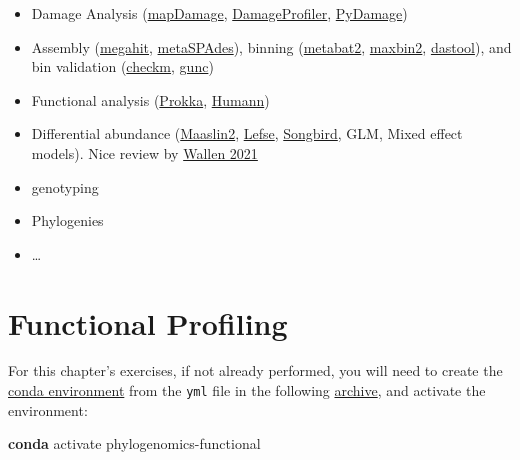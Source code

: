 \documentclass[
  letterpaper,
]{book}
\newenvironment{Shaded}{}{}
\newcommand{\ExtensionTok}[1]{\textcolor[rgb]{0.84,0.23,0.29}{\textbf{#1}}}
\newcommand{\NormalTok}[1]{\textcolor[rgb]{0.14,0.16,0.18}{#1}}
\providecommand{\tightlist}{%
  \setlength{\itemsep}{0pt}\setlength{\parskip}{0pt}}\usepackage{longtable,booktabs,array}
\begin{document}
\begin{itemize}
\tightlist
\item
  Damage Analysis
  (\href{https://ginolhac.github.io/mapDamage/}{mapDamage},
  \href{https://github.com/Integrative-Transcriptomics/DamageProfiler}{DamageProfiler},
  \href{https://github.com/maxibor/pydamage}{PyDamage})
\item
  Assembly (\href{https://github.com/voutcn/megahit}{megahit},
  \href{https://github.com/ablab/spades}{metaSPAdes}), binning
  (\href{https://bitbucket.org/berkeleylab/metabat/src/master/}{metabat2},
  \href{https://sourceforge.net/projects/maxbin2/}{maxbin2},
  \href{https://github.com/cmks/DAS_Tool}{dastool}), and bin validation
  (\href{https://github.com/Ecogenomics/CheckM}{checkm},
  \href{https://github.com/grp-bork/gunc}{gunc})
\item
  Functional analysis
  (\href{https://github.com/tseemann/prokka}{Prokka},
  \href{https://github.com/biobakery/humann}{Humann})
\item
  Differential abundance
  (\href{https://github.com/biobakery/Maaslin2}{Maaslin2},
  \href{https://github.com/biobakery/lefse}{Lefse},
  \href{https://github.com/biocore/songbird}{Songbird}, GLM, Mixed
  effect models). Nice review by
  \href{https://doi.org/10.1186/s12859-021-04193-6}{Wallen 2021}
\item
  genotyping
\item
  Phylogenies
\item
  \ldots{}
\end{itemize}

\hypertarget{functional-profiling-1}{%
\chapter{Functional Profiling}\label{functional-profiling-1}}

\begin{tcolorbox}[enhanced jigsaw, opacitybacktitle=0.6, bottomtitle=1mm, opacityback=0, colback=white, coltitle=black, leftrule=.75mm, toprule=.15mm, title=\textcolor{quarto-callout-tip-color}{\faLightbulb}\hspace{0.5em}{Tip}, colframe=quarto-callout-tip-color-frame, toptitle=1mm, arc=.35mm, left=2mm, titlerule=0mm, breakable, rightrule=.15mm, bottomrule=.15mm, colbacktitle=quarto-callout-tip-color!10!white]

For this chapter's exercises, if not already performed, you will need to
create the \protect\hyperlink{creating-a-conda-environment}{conda
environment} from the \texttt{yml} file in the following
\href{https://doi.org/10.5281/zenodo.6983188}{archive}, and activate the
environment:

\begin{Shaded}
\begin{Highlighting}[]
\ExtensionTok{conda}\NormalTok{ activate phylogenomics{-}functional}
\end{Highlighting}
\end{Shaded}

\end{tcolorbox}
\end{document}
